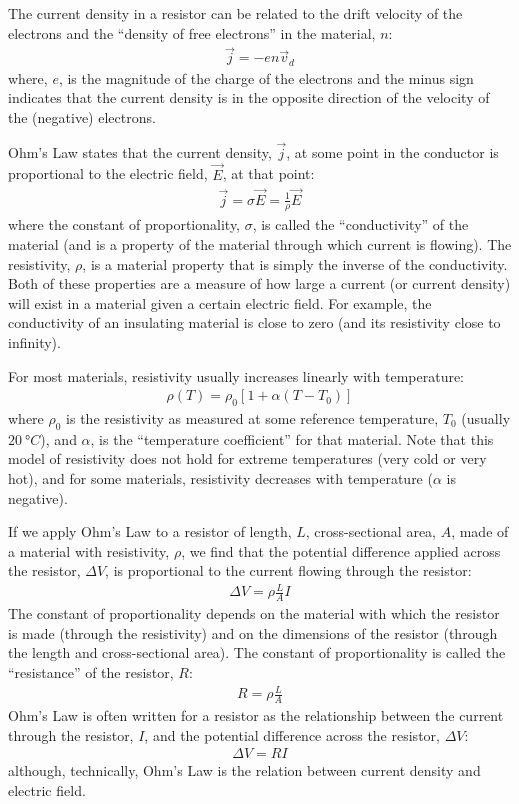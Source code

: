 \begin{chapterSummary}
The current density in a resistor can be related to the drift velocity of the electrons and the ``density of free electrons'' in the material, $n$:
\begin{align*}
\vec j = -en\vec v_d
\end{align*}
where, $e$,  is the magnitude of the charge of the electrons and the minus sign indicates that the current density is in the opposite direction of the velocity of the (negative) electrons.

Ohm's Law states that the current density, $\vec j$, at some point in the conductor is proportional to the electric field, $\vec E$, at that point:
\begin{align*}
\vec j=\sigma \vec E=\frac{1}{\rho}\vec E
\end{align*}
where the constant of proportionality, $\sigma$, is called the ``conductivity'' of the material (and is a property of the material through which current is flowing). The resistivity, $\rho$, is a material property that is simply the inverse of the conductivity. Both of these properties are a measure of how large a current (or current density) will exist in a material given a certain electric field. For example, the conductivity of an insulating material is close to zero (and its resistivity close to infinity).

For most materials, resistivity usually increases linearly with temperature:
\begin{align*}
\rho(T)=\rho_0[1+\alpha(T-T_0)]
\end{align*}
where $\rho_0$ is the resistivity as measured at some reference temperature, $T_0$ (usually $\SI{20}{\degree C}$), and $\alpha$, is the ``temperature coefficient'' for that material. Note that this model of resistivity does not hold for extreme temperatures (very cold or very hot), and for some materials, resistivity decreases with temperature ($\alpha$ is negative).

If we apply Ohm's Law to a resistor of length, $L$, cross-sectional area, $A$, made of a material with resistivity, $\rho$, we find that the potential difference applied across the resistor, $\Delta V$, is proportional to the current flowing through the resistor:
\begin{align*}
\Delta V =\rho \frac{L}{A} I
\end{align*}
The constant of proportionality depends on the material with which the resistor is made (through the resistivity) and on the dimensions of the resistor (through the length and cross-sectional area). The constant of proportionality is called the ``resistance'' of the resistor, $R$:
\begin{align*}
R=\rho \frac{L}{A}
\end{align*}
Ohm's Law is often written for a resistor as the relationship between the current through the resistor, $I$, and the potential difference across the resistor, $\Delta V$:
\begin{align*}
\Delta V = RI
\end{align*}
although, technically, Ohm's Law is the relation between current density and electric field.


\end{chapterSummary}
